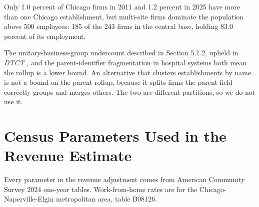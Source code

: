 \documentclass[12pt,letterpaper]{article}
\begin{document}
Only 1.0 percent of Chicago firms in 2011 and 1.2 percent in 2025 have more than one Chicago establishment, but multi-site firms dominate the population above 500 employees: 185 of the 243 firms in the central base, holding 83.0 percent of its employment.

The unitary-business-group undercount described in Section 5.1.2, upheld in \textit{DTCT} \citep{dtct2011}, and the parent-identifier fragmentation in hospital systems both mean the rollup is a lower bound. An alternative that clusters establishments by name is not a bound on the parent rollup, because it splits firms the parent field correctly groups and merges others. The two are different partitions, so we do not use it.

\section{Census Parameters Used in the Revenue Estimate}

Every parameter in the revenue adjustment comes from American Community Survey 2024 one-year tables. Work-from-home rates are for the Chicago-Naperville-Elgin metropolitan area, table B08126.
\end{document}
